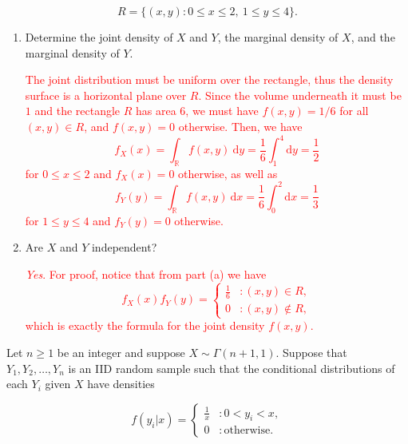 \documentclass[12pt,reqno]{amsart}
\begin{document}
	\[R=\{(x,y) : 0\leq x \leq 2, \ 1\leq y\leq 4\}.
	\]

\medskip
\begin{enumerate}
\item Determine the joint density of $X$ and $Y$, the marginal density of $X$, and the marginal density of $Y$.


\bigskip
\textcolor{red}{The joint distribution must be uniform over the rectangle, thus the density surface is a horizontal plane over $R$. Since the volume underneath it must be $1$ and the rectangle $R$ has area $6$, we must have $f(x,y) = 1/6$ for all $(x,y)\in R$, and $f(x,y) =0$ otherwise. Then, we have
	\[f_X(x) = \int_{\mathbb{R}} f(x,y) \ \text{d} y = \frac{1}{6} \int_1^4 \text{d} y = \frac{1}{2}
	\]
for $0 \leq x \leq 2$ and $f_X(x) =0$ otherwise, as well as
	\[f_Y(y) = \int_{\mathbb{R}} f(x,y) \ \text{d} x = \frac{1}{6} \int_0^2 \text{d} x = \frac{1}{3}
	\]
for $1 \leq y \leq 4$ and $f_Y(y)=0$ otherwise.}
\bigskip

\item Are $X$ and $Y$ independent?

\bigskip
\textcolor{red}{\textit{Yes}. For proof, notice that from part (a) we have
	\[f_X(x) f_Y(y) = \begin{cases}
	\frac{1}{6} & : (x,y) \in R, \\
	0 & : (x,y) \notin R,
	\end{cases}
	\]
which is exactly the formula for the joint density $f(x,y)$.}
\end{enumerate}






\bigskip
\prob Let $n\geq 1$ be an integer and suppose $X\sim \Gamma(n+1,1)$. Suppose that $Y_1,Y_2,\ldots,Y_n$ is an IID random sample such that the conditional distributions of each $Y_i$ given $X$ have densities

	\[f(y_i|x) = \begin{cases}
	\frac{1}{x} & : 0 < y_i < x, \\
	0 & : \text{otherwise}.
	\end{cases}
	\]
	
\end{document}
